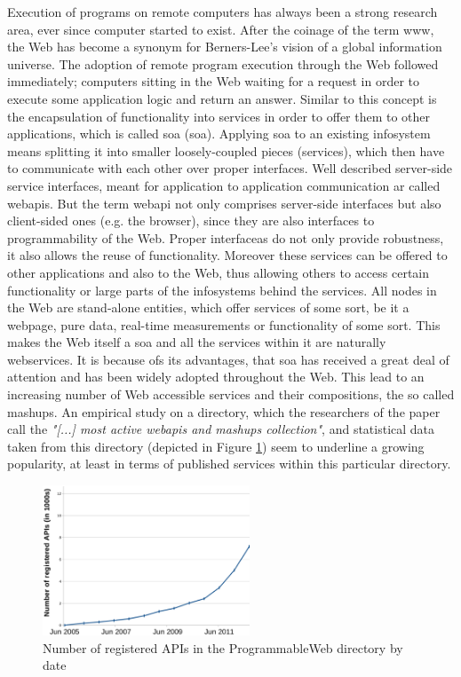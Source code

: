 Execution of programs on remote computers has always been a strong research area, ever since computer started to exist.
After the coinage of the term \textrm{\gls{www}}\cite{DBLP:journals/en/Berners-LeeCGP92}, the Web has become a synonym for Berners-Lee's vision of a global information universe.
The adoption of remote program execution through the Web followed immediately; computers sitting in the Web waiting for a request in order to execute some application logic and return an answer.
Similar to this concept is the encapsulation of functionality into services\cite{peltz2003web} in order to offer them to other applications, which is called \textrm{\acrlong{soa} (\acrshort{soa})}\cite{perrey2003service}.
Applying \textrm{\acrshort{soa}} to an existing \textrm{\gls{infosystem}} means splitting it into smaller loosely-coupled pieces (services), which then have to communicate with each other over proper interfaces.
Well described server-side service interfaces, meant for application to application communication ar called \textrm{\glspl{webapi}}. 
But the term \textrm{\gls{webapi}} not only comprises server-side interfaces but also client-sided ones (e.g. the browser), since they are also interfaces to programmability of the Web.
Proper interfaceas do not only provide robustness, it also allows the reuse of functionality.
Moreover these services can be offered to other applications and also to the Web, thus allowing others to access certain functionality or large parts of the \textrm{\glspl{infosystem}} behind the services.
All nodes in the Web are stand-alone entities, which offer services of some sort, be it a webpage, pure data, real-time measurements or functionality of some sort.
This makes the Web itself a \textrm{\acrlong{soa}} and all the services within it are naturally \textrm{\glspl{webservice}}.
It is because ofs its advantages, that \textrm{\acrshort{soa}} has received a great deal of attention and has been widely adopted throughout the Web.
This lead to an increasing number of Web accessible services and their compositions, the so called \textrm{\glspl{mashup}}.
An empirical study\cite{conf/icws/HuangFT12} on a directory, which the researchers of the paper call the \textit{"[...] most active \gls{webapi}s and mashups collection"}, and statistical data taken from this directory (depicted in Figure \ref{fig:NumOfAPIs}) seem to underline a growing popularity, at least in terms of published services within this particular directory.

\begin{figure}[!ht]
  \centering
  \includegraphics[width=0.55\textwidth]{figures/NumOfAPIs}
  \caption{Number of registered APIs in the ProgrammableWeb directory by date}
  \label{fig:NumOfAPIs}
\end{figure}


